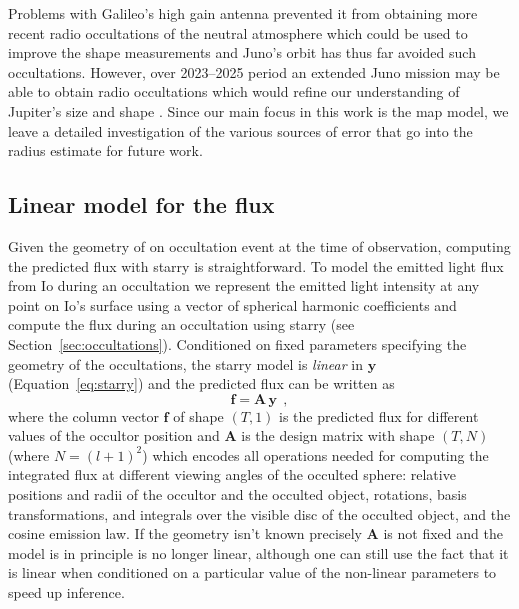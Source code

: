 \documentclass[12pt,dvipsnames]{report}
\newcommand{\ssf}[1]{\textsf{#1}}
\renewcommand{\vec}[1]{\boldsymbol{\mathbf{#1}}}
\newcommand{\hquad}{~~}
\begin{document}
Problems with Galileo's high gain antenna prevented it from obtaining more recent 
radio occultations of the neutral atmosphere which could be used to improve the shape 
measurements and Juno's orbit has thus far avoided such occultations.  
However, over 2023--2025 period an extended Juno mission may be able to obtain 
radio occultations which would refine our understanding of Jupiter's size and shape 
\citep{2020AGUFMP012...07H}.
Since our main focus in this work is the map model, we leave a detailed investigation 
of the various sources of error that go into the radius estimate for future work.

\subsection{Linear model for the flux}
\label{ssec:model_spec}
Given the geometry of on occultation event at the time of observation, 
computing the predicted flux with \textsf{starry} is straightforward.
To model the emitted light flux from Io during an occultation we represent the emitted 
light intensity at any point on Io's surface using a vector of spherical harmonic 
coefficients and compute the flux during an occultation using \ssf{starry}
(see Section~\ref{sec:occultations}). 
Conditioned on fixed parameters specifying the geometry of the occultations, the 
\textsf{starry} model is \emph{linear} in $\vec{y}$ (Equation~\ref{eq:starry}) and 
the predicted flux can be written as 
\begin{equation}
    \mathbf{f}=\mathbf{A}\,\mathbf{y}
    \hquad,
    \label{eq:starry_linear_model}
\end{equation}
where the column vector $\mathbf{f}$ of shape $(T, 1)$ is the predicted flux for 
different values of the occultor position and $\mathbf{A}$ is the design matrix 
\citep[see appendix B.1. in ][]{2021AJ....162..123L} with shape $(T, N)$ (where
$N=(l+1)^2$) which encodes all operations needed for computing the integrated flux at 
different viewing angles of the occulted sphere: relative positions and radii of the 
occultor and the occulted object, rotations, basis transformations, and integrals over the 
visible disc of the occulted object, and the cosine emission law.
If the geometry isn't known precisely $\mathbf{A}$ is not fixed and the model is in 
principle is no longer linear, although one can still use the fact that it is linear when 
conditioned on a particular value of the non-linear parameters to speed up inference.
\end{document}
